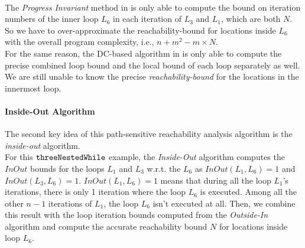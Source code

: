 \\
The \emph{Progress Invariant} method in \cite{GulwaniJK09} is only able to compute
the
bound on iteration numbers
of the inner loop $L_6$ in each iteration of $L_3$ and $L_1$, which are both $N$.
So we have to over-approximate the reachability-bound for locations inside $L_6$ with the
overall program complexity, i.e., $n + m^2 - m \times N$.
\\
For the same reason, the DC-based algorithm in \cite{sinn2017complexity}
is only able to
compute the precise combined loop bound and the local bound of each loop
separately as well.
We are still unable to know the precise \emph{reachability-bound} for the locations in the innermost loop.
\paragraph*{Inside-Out Algorithm}
The second key idea of this path-sensitive reachability analysis algorithm is the
\emph{inside-out} algorithm.
%
\\
For this ${\mathtt{threeNestedWhile}}$ example, 
the \emph{Inside-Out} algorithm computes the $InOut$ bounds for the loops $L_1$ and $L_3$
w.r.t. the $L_6$ as
$InOut(L_1, L_6) = 1$ and
$InOut(L_3, L_6) = 1$.
$InOut(L_1, L_6) = 1$ means that during all the loop $L_1$'s iterations, there is only 1 iteration where the loop $L_6$ is executed.
Among all the other $n - 1$ iterations of $L_1$, the loop $L_6$ isn't executed at all.
Then, we combine this result with the loop iteration bounds
computed from the \emph{Outside-In} algorithm and compute
the 
accurate reachability bound $N$ for locations inside loop $L_6$.

